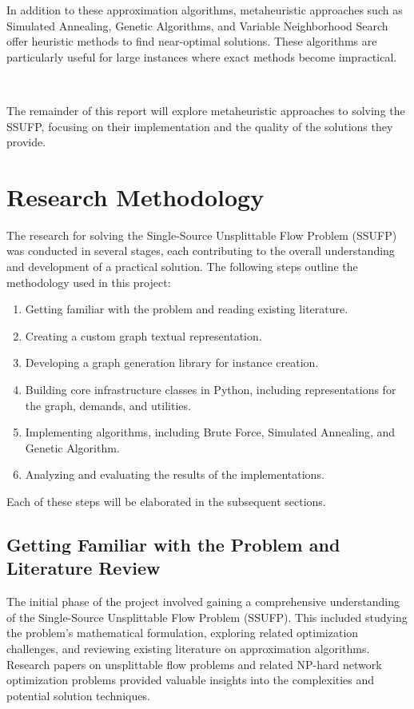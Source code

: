 \documentclass[a4paper,12pt]{article}
\begin{document}
\noindent In addition to these approximation algorithms, metaheuristic approaches such as Simulated Annealing, Genetic Algorithms, and Variable Neighborhood Search offer heuristic methods to find near-optimal solutions. These algorithms are particularly useful for large instances where exact methods become impractical.

\

\noindent The remainder of this report will explore metaheuristic approaches to solving the SSUFP, focusing on their implementation and the quality of the solutions they provide.

\section{Research Methodology}

The research for solving the Single-Source Unsplittable Flow Problem (SSUFP) was conducted in several stages, each contributing to the overall understanding and development of a practical solution. The following steps outline the methodology used in this project:

\begin{enumerate}
    \item Getting familiar with the problem and reading existing literature.
    \item Creating a custom graph textual representation.
    \item Developing a graph generation library for instance creation.
    \item Building core infrastructure classes in Python, including representations for the graph, demands, and utilities.
    \item Implementing algorithms, including Brute Force, Simulated Annealing, and Genetic Algorithm.
    \item Analyzing and evaluating the results of the implementations.
\end{enumerate}

Each of these steps will be elaborated in the subsequent sections.

\subsection{Getting Familiar with the Problem and Literature Review}

The initial phase of the project involved gaining a comprehensive understanding of the Single-Source Unsplittable Flow Problem (SSUFP). This included studying the problem's mathematical formulation, exploring related optimization challenges, and reviewing existing literature on approximation algorithms. Research papers on unsplittable flow problems and related NP-hard network optimization problems provided valuable insights into the complexities and potential solution techniques.
\end{document}

